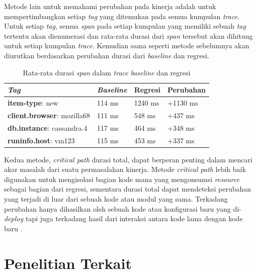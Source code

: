 Metode lain untuk memahami perubahan pada kinerja adalah untuk mempertimbangkan setiap \textit{tag} yang ditemukan pada semua kumpulan \textit{trace}. Untuk setiap \textit{tag}, semua \textit{span} pada setiap kumpulan yang memiliki sebuah \textit{tag} tertentu akan dienumerasi dan rata-rata durasi dari \textit{span} tersebut akan dihitung untuk setiap kumpulan \textit{trace}. Kemudian sama seperti metode sebelumnya akan diurutkan berdasarkan perubahan durasi dari \textit{baseline} dan regresi.

\begin{small}
	\begin{longtable}{ | p{5cm} | p{2cm} | p{2cm} | p{2cm} | }
		\caption{Rata-rata durasi \textit{span} dalam \textit{trace} \textit{baseline} dan regresi}
		\label{corr-tab-3}                                                           
		\\ \hline
		\centering\bfseries{\textit{Tag}} & \centering\bfseries{\textit{Baseline}} & \centering\bfseries{Regresi} & \centering\bfseries{Perubahan} \tabularnewline \hline
		\endfirsthead
		\textbf{item-type}: new & 114 ms & 1240 ms & +1130 ms \\ \hline
		\textbf{client.browser}: mozilla68 & 111 ms & 548 ms & +437 ms \\ \hline
		\textbf{db.instance}: cassandra.4 & 117 ms & 464 ms & +348 ms \\ \hline
		\textbf{runinfo.host}: vm123 & 115 ms & 453 ms & +337 ms \\ \hline
	\end{longtable}
\end{small}

Kedua metode, \textit{critical path} durasi total, dapat berperan penting dalam mencari akar masalah dari suatu permasalahan kinerja. Metode \textit{critical path} lebih baik digunakan untuk mengisolasi bagian kode mana yang mengonsumsi \textit{resource} sebagai bagian dari regresi, sementara durasi total dapat mendeteksi perubahan yang terjadi di luar dari sebuah kode atau modul yang sama. Terkadang perubahan hanya dihasilkan oleh sebuah kode atau konfigurasi baru yang di-\textit{deploy} tapi juga terkadang hasil dari interaksi antara kode lama dengan kode baru \citep{parker2020distributed}. 

\section{Penelitian Terkait}

